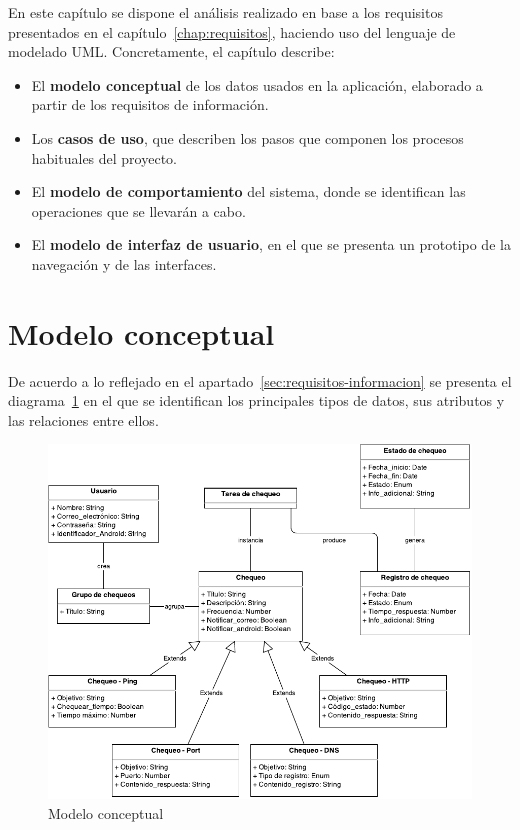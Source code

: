 En este capítulo se dispone el análisis realizado en base a los requisitos
presentados en el capítulo~\ref{chap:requisitos}, haciendo uso del lenguaje de
modelado UML. Concretamente, el capítulo describe:

\begin{itemize}
\item El \textbf{modelo conceptual} de los datos usados en la aplicación,
  elaborado a partir de los requisitos de información.
\item Los \textbf{casos de uso}, que describen los pasos que componen los
  procesos habituales del proyecto.
\item El \textbf{modelo de comportamiento} del sistema, donde se identifican las
  operaciones que se llevarán a cabo.
\item El \textbf{modelo de interfaz de usuario}, en el que se presenta un
  prototipo de la navegación y de las interfaces.
\end{itemize}

\section{Modelo conceptual}

De acuerdo a lo reflejado en el apartado~\ref{sec:requisitos-informacion} se
presenta el diagrama~\ref{fig:modelo-conceptual} en el que se identifican los
principales tipos de datos, sus atributos y las relaciones entre ellos.

\begin{figure}[hp]
  \centering
  \includegraphics[width=\textwidth]{4_analisis/diagrama_clases_conceptuales}
  \caption{Modelo conceptual}
  \label{fig:modelo-conceptual}
\end{figure}

